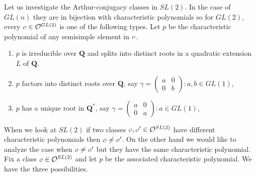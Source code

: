 \documentclass[11pt]{amsart}
\def\Q{\mathbf Q}
\def\O{\mathcal O}
\def\o{\scalebox{0.8}{$\scriptstyle\mathcal{O}$}}
\theoremstyle{remark}
\begin{document}
Let us investigate the Arthur-conjugacy classes in $SL(2)$. In the case of $GL(n)$ they are in bijection with characteristic polynomials so for $GL(2)$, every $\o \in \O^{GL(2)}$ is one of the following types. Let $p$ be the characteristic polynomial of any semisimple element in $\o$. 
\begin{enumerate}
	\item $p$ is irreducible over $\Q$ and splits into distinct roots in a quadratic extension $L$ of $\Q$.
	\item $p$ factors into distinct roots over $\Q$, say $\gamma = \begin{pmatrix} a & 0 \\ 0 & b \end{pmatrix}: 
			a, b \in GL(1)$,
	\item $p$ has a unique root in $\Q^*$, say $\gamma = \begin{pmatrix} a & 0 \\ 0 & a \end{pmatrix}: a \in GL(1)$,
\end{enumerate}
When we look at $SL(2)$ if two classes $\o, \o' \in \O^{SL(2)}$ have different characteristic polynomials then $\o \neq \o'$. On the other hand we would like to analyze the case when $\o \neq \o'$ but they have the same characteristic polynomial. Fix a class $\o \in \O^{SL(2)}$ and let $p$ be the associated characteristic polynomial. We have the three possibilities. 
\end{document}
